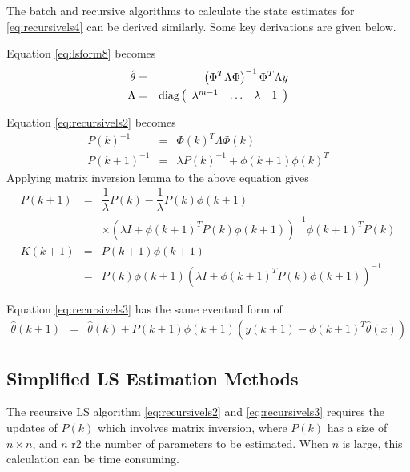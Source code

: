 The batch and recursive algorithms to calculate the state estimates for \eqref{eq:recursivels4} can be derived similarly. Some key derivations are given below.

Equation \eqref{eq:lsform8} becomes
\begin{eqnarray}
\hat{\theta} &=& \left(\Phi^T\Lambda\Phi\right)^{-1}\Phi^T\Lambda y \nonumber \\
\Lambda &=& \textup{diag}\left(\begin{array}{cccc}
                                 \lambda^{m-1} & \ldots & \lambda & 1
                               \end{array}\right) \nonumber
\end{eqnarray}

Equation \eqref{eq:recursivels2} becomes
\begin{eqnarray}
P(k)^{-1} &=& \Phi(k)^T\Lambda \Phi(k) \nonumber \\
P(k+1)^{-1} &=& \lambda P(k)^{-1} + \phi(k+1)\phi(k)^T \nonumber
\end{eqnarray}
Applying matrix inversion lemma to the above equation gives
\begin{eqnarray}
P(k+1) &=& \dfrac{1}{\lambda}P(k) - \dfrac{1}{\lambda}P(k)\phi(k+1) \nonumber \\ && \times \left(\lambda I + \phi(k+1)^TP(k)\phi(k+1)\right)^{-1}\phi(k+1)^TP(k) \nonumber \\
K(k+1) &=& P(k+1) \phi(k+1) \nonumber \\
&=&  P(k)\phi(k+1)\left(\lambda I + \phi(k+1)^TP(k)\phi(k+1)\right)^{-1} \nonumber
\end{eqnarray}

Equation \eqref{eq:recursivels3} has the same eventual form of
\begin{eqnarray}
  \hat{\theta}(k+1) &=& \hat{\theta}(k) + P(k+1)\phi(k+1)\left(y(k+1) - \phi(k+1)^T\hat{\theta}(x)\right) \nonumber
\end{eqnarray}

\subsection{Simplified LS Estimation Methods}

The recursive LS algorithm \eqref{eq:recursivels2} and \eqref{eq:recursivels3} requires the updates of $P(k)$ which involves matrix inversion, where $P(k)$ has a size of $n\times n$, and $n$ r2 the number of parameters to be estimated. When $n$ is large, this calculation can be time consuming.


